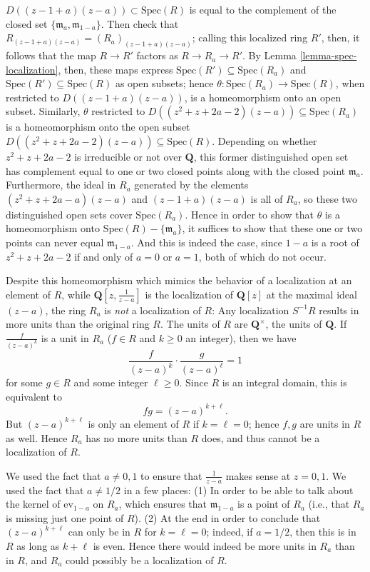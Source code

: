 \begin{example}
$D((z-1 + a)(z-a))\subset\text{Spec}(R)$ is equal to the complement of
the closed set $\lbrace\mathfrak{m}_a, \mathfrak{m}_{1-a}\rbrace$.
Then check that $R_{(z-1 + a)(z-a)} = (R_a)_{(z-1 + a)(z-a)}$; calling
this localized ring $R'$, then, it follows that the map $R\to R'$
factors as $R\to R_a\to R'$.  By Lemma
\ref{lemma-spec-localization}, then, these maps express
$\text{Spec}(R')\subseteq\text{Spec}(R_a)$ and
$\text{Spec}(R')\subseteq\text{Spec}(R)$ as open subsets; hence
$\theta : \text{Spec}(R_a)\to\text{Spec}(R)$, when restricted to
$D((z-1 + a)(z-a))$, is a homeomorphism onto an open subset.
Similarly, $\theta$ restricted to
$D((z^2 + z + 2a-2)(z-a))\subseteq\text{Spec}(R_a)$ is a homeomorphism
onto the open subset $D((z^2 + z + 2a-2)(z-a))\subseteq\text{Spec}(R)$.
Depending on whether $z^2 + z + 2a-2$ is irreducible or not over
$\mathbf{Q}$, this former distinguished open set has complement
equal to one or two closed points along with the closed point
$\mathfrak{m}_a$. Furthermore, the ideal in $R_a$ generated by the
elements $(z^2 + z + 2a-a)(z-a)$ and $(z-1 + a)(z-a)$ is all of $R_a$, so
these two distinguished open sets cover $\text{Spec}(R_a)$. Hence in
order to show that $\theta$ is a homeomorphism onto
$\text{Spec}(R)-\lbrace\mathfrak{m}_a\rbrace$, it suffices to show
that these one or two points can never equal $\mathfrak{m}_{1-a}$.
And this is indeed the case, since $1-a$ is a root of $z^2 + z + 2a-2$
if and only of $a = 0$ or $a = 1$, both of which do not occur.

\medskip\noindent
Despite this homeomorphism which mimics the behavior of a
localization at an element of $R$, while
$\mathbf{Q}[z, \frac{1}{z-a}]$ is the localization of $\mathbf{Q}[z]$
at the maximal ideal $(z-a)$, the ring $R_a$ is \textit{not} a
localization of $R$: Any localization $S^{-1}R$ results in more
units than the original ring $R$.  The units of $R$ are
$\mathbf{Q}^\times$, the units of $\mathbf{Q}$.  If
$\frac{f}{(z-a)^k}$ is a unit in $R_a$ ($f\in R$ and $k\geq0$ an
integer), then we have
$$
\frac{f}{(z-a)^k}\cdot\frac{g}{(z-a)^\ell} = 1
$$
for some $g\in R$ and some integer $\ell\geq0$.  Since $R$ is an
integral domain, this is equivalent to
$$
fg = (z-a)^{k + \ell}.
$$
But $(z-a)^{k + \ell}$ is only an element of $R$ if $k = \ell = 0$; hence
$f, g$ are units in $R$ as well.  Hence $R_a$ has no more units than
$R$ does, and thus cannot be a localization of $R$.

\medskip\noindent
We used the fact that $a\neq 0, 1$ to ensure that
$\frac{1}{z-a}$ makes sense at $z = 0, 1$.  We used the fact that
$a\neq 1/2$ in a few places: (1) In order to be able to talk about
the kernel of $\text{ev}_{1-a}$ on $R_a$, which ensures that
$\mathfrak{m}_{1-a}$ is a point of $R_a$ (i.e., that $R_a$ is
missing just one point of $R$). (2) At the end in order to conclude
that $(z-a)^{k + \ell}$ can only be in $R$ for $k = \ell = 0$; indeed, if
$a = 1/2$, then this is in $R$ as long as $k + \ell$ is even. Hence
there would indeed be more units in $R_a$ than in $R$, and $R_a$
could possibly be a localization of $R$.
\end{example}







